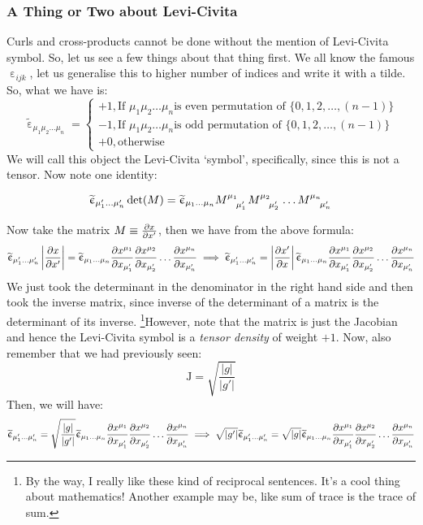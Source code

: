 \subsubsection{A Thing or Two about Levi-Civita}
Curls and cross-products cannot be done without the mention of Levi-Civita symbol. So, let us see a few things about that thing first. 
We all know the famous $\upepsilon_{ijk}$, let us generalise this to higher number of indices and write it with a tilde. So, what we have is:
$$\widetilde{\upepsilon}_{\mu_1\mu_2\ldots\mu_n} = \begin{cases}
    +1, \text{If } {\mu_1\mu_2\ldots\mu_n} \text{is even permutation of } \{0,1,2,\ldots, (n-1)\} \\
     -1, \text{If } {\mu_1\mu_2\ldots\mu_n} \text{is odd permutation of } \{0,1,2,\ldots, (n-1)\}\\
     +0, \text{otherwise}
\end{cases}$$
We will call this object the Levi-Civita `symbol', specifically, since this is not a tensor. Now note one identity:
\begin{identity}
$$\widetilde{\upepsilon}_{\mu_1'\ldots \mu_n'}\det(M)= \widetilde{\upepsilon}_{\mu_1\ldots \mu_n} \tensor{M}{^{\mu_1} _{\mu_1'}}\tensor{M}{^{\mu_2} _{\mu_2'}}\ldots\tensor{M}{^{\mu_n} _{\mu_n'}}$$
\end{identity}
Now take the matrix $M \equiv \pdv{x}{x'}$, then we have from the above formula:
$$\widetilde{\upepsilon}_{\mu_1'\ldots \mu_n'}\left|\pdv{x}{x'}\right|= \widetilde{\upepsilon}_{\mu_1\ldots \mu_n} \pdv{x^{\mu_1}}{x_{\mu_1'}}\pdv{x^{\mu_2}}{x_{\mu_2'}}\ldots\pdv{x^{\mu_n}}{x_{\mu_n'}}\implies\widetilde{\upepsilon}_{\mu_1'\ldots \mu_n'}=\left|\pdv{x'}{x}\right| \widetilde{\upepsilon}_{\mu_1\ldots \mu_n} \pdv{x^{\mu_1}}{x_{\mu_1'}}\pdv{x^{\mu_2}}{x_{\mu_2'}}\ldots\pdv{x^{\mu_n}}{x_{\mu_n'}} $$
We just took the determinant in the denominator in the right hand side and then took the inverse matrix, since inverse of the determinant of a matrix is the determinant of its inverse. \footnote{By the way, I really like these kind of reciprocal sentences. It's a cool thing about mathematics! Another example may be, like sum of trace is the trace of sum.}However, note that the matrix is just the Jacobian and hence the Levi-Civita symbol is a \textit{tensor density} of weight $+1$. Now, also remember that we had previously seen:
$$\mathrm{J} = \sqrt{\frac{|g|}{|g'|}}$$
Then, we will have:
$$\widetilde{\upepsilon}_{\mu_1'\ldots \mu_n'}= \sqrt{\frac{|g|}{|g'|}} \widetilde{\upepsilon}_{\mu_1\ldots \mu_n} \pdv{x^{\mu_1}}{x_{\mu_1'}}\pdv{x^{\mu_2}}{x_{\mu_2'}}\ldots\pdv{x^{\mu_n}}{x_{\mu_n'}}\implies \sqrt{{|g'|}}\widetilde{\upepsilon}_{\mu_1'\ldots \mu_n'}= \sqrt{{|g|}} \widetilde{\upepsilon}_{\mu_1\ldots \mu_n} \pdv{x^{\mu_1}}{x_{\mu_1'}}\pdv{x^{\mu_2}}{x_{\mu_2'}}\ldots\pdv{x^{\mu_n}}{x_{\mu_n'}} $$
